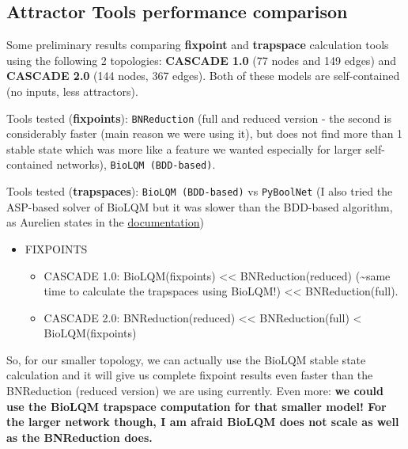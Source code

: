 \documentclass[
  12pt,
]{book}
\providecommand{\tightlist}{%
  \setlength{\itemsep}{0pt}\setlength{\parskip}{0pt}}
\begin{document}
\hypertarget{attrToolCmp}{%
\subsection*{Attractor Tools performance comparison}\label{attrToolCmp}}

Some preliminary results comparing \textbf{fixpoint} and \textbf{trapspace} calculation tools using the following 2 topologies: \textbf{CASCADE 1.0} (77 nodes and 149 edges) and \textbf{CASCADE 2.0} (144 nodes, 367 edges). Both of these models are self-contained (no inputs, less attractors).

Tools tested (\textbf{fixpoints}): \texttt{BNReduction} (full and reduced version - the second is considerably faster (main reason we were using it), but does not find more than 1 stable state which was more like a feature we wanted especially for larger self-contained networks), \texttt{BioLQM\ (BDD-based)}.

Tools tested (\textbf{trapspaces}): \texttt{BioLQM\ (BDD-based)} vs \texttt{PyBoolNet} (I also tried the ASP-based solver of BioLQM but it was slower than the BDD-based algorithm, as Aurelien states in the \href{http://colomoto.org/biolqm/doc/tools-trapspace.html}{documentation})

\begin{itemize}
\tightlist
\item
  FIXPOINTS

  \begin{itemize}
  \tightlist
  \item
    CASCADE 1.0: BioLQM(fixpoints) \textless\textless{} BNReduction(reduced) (\textasciitilde same time to calculate the trapspaces using BioLQM!) \textless\textless{} BNReduction(full).
  \item
    CASCADE 2.0: BNReduction(reduced) \textless\textless{} BNReduction(full) \textless{} BioLQM(fixpoints)
  \end{itemize}
\end{itemize}

So, for our smaller topology, we can actually use the BioLQM stable state calculation and it will give us complete fixpoint results even faster than the BNReduction (reduced version) we are using currently. Even more: \textbf{we could use the BioLQM trapspace computation for that smaller model! For the larger network though, I am afraid BioLQM does not scale as well as the BNReduction does.}
\end{document}
